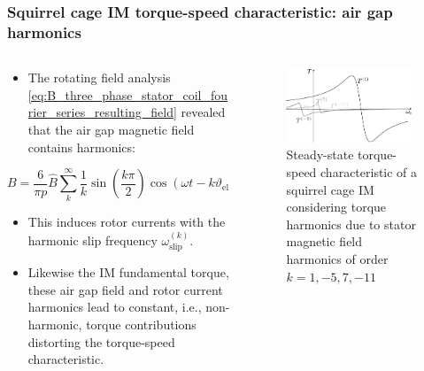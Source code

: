 \begin{frame}
	\frametitle{Squirrel cage IM torque-speed characteristic: air gap harmonics}
    \begin{columns}
		\begin{column}{0.45\textwidth}
	      \begin{itemize}
            \item The rotating field analysis \eqref{eq:B_three_phase_stator_coil_fourier_series_resulting_field} revealed that the air gap magnetic field contains harmonics:
          \end{itemize}
          $$
          B = \frac{6}{\pi p} \hat{B} \sum_{k}^{\infty} \frac{1}{k} \sin\left(\frac{k \pi}{2}\right) \cos(\omega t - k \vartheta_\mathrm{el}) 
          $$
          \begin{itemize}
            \item This induces rotor currents with the harmonic slip frequency $\omega^{(k)}_\mathrm{slip}$.
            \item Likewise the IM fundamental torque, these air gap field and rotor current harmonics lead to constant, i.e., non-harmonic, torque contributions distorting the torque-speed characteristic.
          \end{itemize}
        \end{column}
        \begin{column}{0.555\textwidth}
            \begin{figure}
                \centering
                \includegraphics[width=0.95\textwidth]{fig/lec06/Kloss_formula_harmonics.pdf}
                \caption{Steady-state torque-speed characteristic of a squirrel cage IM considering torque harmonics due to stator magnetic field harmonics of order $k=1,-5,7,-11$} 
                \label{fig:Kloss_formula_harmonics}
            \end{figure}
        \end{column}
    \end{columns}
\end{frame}
